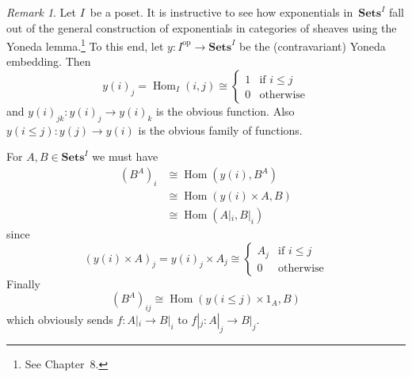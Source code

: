 \documentclass[letterpaper,12pt]{article}
\newcommand{\iso}{\cong}
\DeclareMathOperator{\Hom}{Hom}
\newcommand{\cat}[1]{\mathbf{#1}}
\newcommand{\dual}[1]{#1^{\mathrm{op}}}
\newcommand{\2}{\cat{2}}
\newcommand{\Sets}{\cat{Sets}}
\theoremstyle{definition}
\theoremstyle{remark}
\newtheorem*{rmk}{Remark}
\theoremstyle{direction}
\begin{document}
\begin{rmk}
Let \(I\)~be a poset. It is instructive to see how exponentials in~\(\Sets^I\) fall out of the general construction of exponentials in categories of sheaves using the Yoneda lemma.\footnote{See Chapter~8.} To this end, let \(y:\dual{I}\to\Sets^I\) be the (contravariant) Yoneda embedding. Then
\[y(i)_j=\Hom_I(i,j)\iso\begin{cases}
1&\text{if }i\le j\\
0&\text{otherwise}
\end{cases}\]
and \(y(i)_{jk}:y(i)_j\to y(i)_k\) is the obvious function. Also \(y(i\le j):y(j)\to y(i)\) is the obvious family of functions.

For \(A,B\in\Sets^I\) we must have
\begin{align*}
(B^A)_i&\iso\Hom(y(i),B^A)\\
	&\iso\Hom(y(i)\times A,B)\\
	&\iso\Hom(A|_i,B|_i)
\end{align*}
since
\[(y(i)\times A)_j=y(i)_j\times A_j\iso\begin{cases}
A_j&\text{if }i\le j\\
0&\text{otherwise}
\end{cases}\]
Finally
\[(B^A)_{ij}\iso\Hom(y(i\le j)\times 1_A,B)\]
which obviously sends \(f:A|_i\to B|_i\) to \(f|_j:A|_j\to B|_j\).
\end{rmk}
\end{document}
